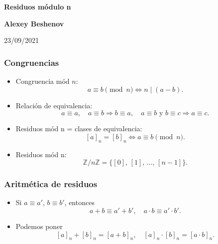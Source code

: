 \documentclass[handout]{beamer}
\newcommand{\ZZ}{\mathbb{Z}}
\begin{document}

\begin{frame}[noframenumbering]
  \begin{center}
    {\LARGE\bf Residuos módulo n

    }

    \vspace{3em}

    {\large\bf Alexey Beshenov}

    \vspace{4em}

    23/09/2021

  \end{center}
\end{frame}


\begin{frame}
  \frametitle{Congruencias}

  \begin{itemize}
    \item<2-> Congruencia mód $n$:
      \[ a \equiv b \pmod{n} \iff n \mid (a-b). \]

    \item<3-> Relación de equivalencia:
      \[
        a\equiv a, \quad
        a\equiv b \Rightarrow b\equiv a, \quad
        a\equiv b \text{ y } b\equiv c \Rightarrow a\equiv c.
      \]

    \item<4-> Residuos mód n = clases de equivalencia:
      $$[a]_n = [b]_n \iff a\equiv b \pmod{n}.$$

    \item<5-> Residuos mód n:
      $$\ZZ/n\ZZ = \{ [0], \, [1], \, \ldots, \, [n-1] \}.$$
    \end{itemize}
\end{frame}


\begin{frame}
  \frametitle{Aritmética de residuos}

  \begin{itemize}
  \item<2-> Si $a \equiv a'$, $b \equiv b'$, entonces
    \[ a+b \equiv a'+b', \quad a\cdot b \equiv a'\cdot b'. \]

  \item<3-> Podemos poner
    \[ [a]_n + [b]_n = [a+b]_n, \quad [a]_n\cdot [b]_n = [a\cdot b]_n. \]
  \end{itemize}  
\end{frame}
\end{document}
